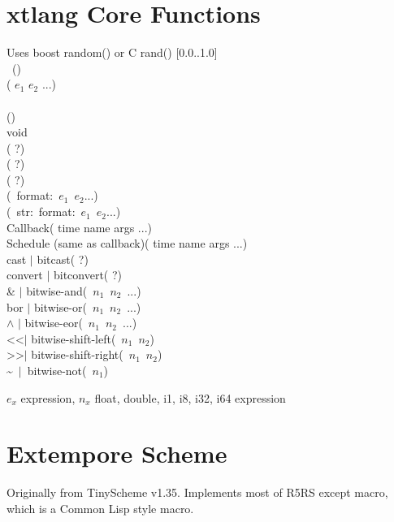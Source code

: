 \documentclass[10pt, twoside]{article}   	%
\begin{document}
\begin{multicols}{3}
\section*{xtlang Core Functions}
Uses boost random() or C rand() [0.0..1.0]  \\
\hphantom{.}\hfill{}~() \\
\hphantom{.}\hfill( $e_1$ $e_2$ ...) \\
\hphantom{.}\hfill{} \\
\hphantom{.}\hfill() \\
void \\
\hphantom{.}\hfill( ?) \\
\hphantom{.}\hfill( ?) \\
\hphantom{.}\hfill( ?) \\
\hphantom{.}\hfill(~format:~$e_1$~$e_2$...) \\
\hphantom{.}\hfill(~str:~format:~$e_1$~$e_2$...)\\
Callback\hfill( time name args ...) \\
Schedule {\scriptsize(same as callback)}\hfill( time name args ...)  \\
cast $\vert$ bitcast\hfill( ?)\\
convert $\vert$ bitconvert\hfill( ?) \\
\& $\vert$ bitwise-and\hfill(~$n_1$~$n_2$~...) \\
bor $\vert$ bitwise-or\hfill(~$n_1$~$n_2$~...) \\
$\wedge$ $\vert$ bitwise-eor\hfill(~$n_1$~$n_2$~...)\\
\textless\textless $\vert$ bitwise-shift-left\hfill(~$n_1$~$n_2$) \\
\textgreater\textgreater $\vert$ bitwise-shift-right\hfill(~$n_1$~$n_2$)\\
\textasciitilde~$\vert$~bitwise-not\hfill(~$n_1$) \\
\scriptsize
{\raggedright
$e_x$ expression,
$n_x$ float, double, i1, i8, i32, i64 expression\par}
\normalsize

\section*{Extempore Scheme}
{\raggedright
Originally from TinyScheme v1.35. Implements most of R5RS except macro, which is a Common Lisp style macro.\par}



\end{multicols}
\end{document}
